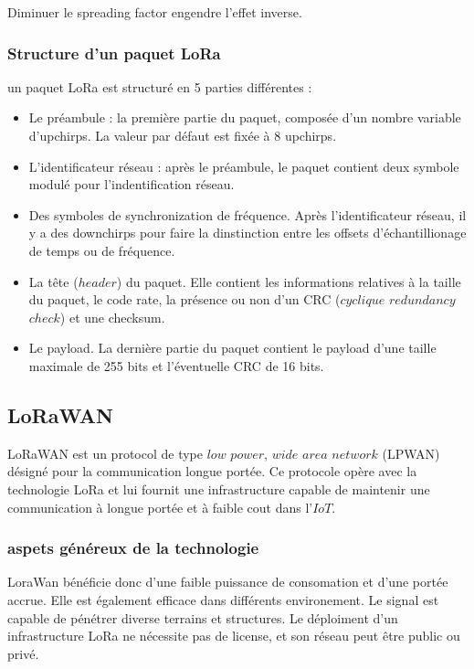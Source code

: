 Diminuer le spreading factor engendre l'effet inverse.

\subsubsection{Structure d'un paquet LoRa}

un paquet LoRa est structuré en 5 parties différentes :

\begin{itemize}
\item Le préambule : la première partie du paquet, composée d'un nombre variable d'upchirps. La valeur par défaut est fixée à 8 upchirps.
\item L'identificateur réseau : après le préambule, le paquet contient deux symbole modulé pour l'indentification réseau.
\item Des symboles de synchronization de fréquence. Après l'identificateur réseau, il y a des downchirps pour faire la dinstinction entre les offsets d'échantillionage de temps ou de fréquence.
\item La tête ($header$) du paquet. Elle contient les informations relatives à la taille du paquet, le code rate, la présence ou non d'un CRC ($cyclique$ $redundancy$ $check$) et une checksum.
\item Le payload. La dernière partie du paquet contient le payload d'une taille maximale de 255 bits et l'éventuelle CRC de 16 bits.
\end{itemize}




\subsection{LoRaWAN}

LoRaWAN est un protocol de type $low$ $power$, $wide$ $area$ $network$ (LPWAN) désigné pour la communication longue portée. Ce protocole opère avec la technologie LoRa et lui fournit une infrastructure capable de maintenir une communication à longue portée et à faible cout dans l'$IoT$.

\subsubsection{aspets généreux de la technologie}

LoraWan bénéficie donc d'une faible puissance de consomation et d'une portée accrue. Elle est également efficace dans différents environement. Le signal est capable de pénétrer diverse terrains et structures.
Le déploiment d'un infrastructure LoRa ne nécessite pas de license, et son réseau peut être public ou privé. 

